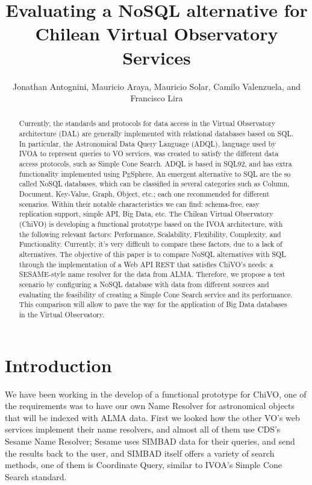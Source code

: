 \documentclass[11pt,twoside]{article}
\begin{document}
\title{Evaluating a NoSQL alternative for Chilean Virtual Observatory Services}
\author{Jonathan Antognini,  Mauricio Araya, Mauricio Solar, Camilo Valenzuela, and  Francisco Lira
}

\begin{abstract}
Currently, the standards and protocols for data access in the Virtual Observatory architecture (DAL) are generally implemented with relational databases based on SQL. In particular, the Astronomical Data Query Language (ADQL), language used by IVOA to represent queries to VO services, was created to satisfy the different data access protocols, such as Simple Cone Search. ADQL is based in SQL92, and has extra functionality implemented using PgSphere. An emergent alternative to SQL are the so called NoSQL databases, which can be classified in several categories such as Column, Document, Key-Value, Graph, Object, etc.; each one recommended for different scenarios. Within their notable characteristics we can find: schema-free, easy replication support, simple API, Big Data, etc. The Chilean Virtual Observatory (ChiVO) is developing a functional prototype based on the IVOA architecture, with the following relevant factors: Performance, Scalability, Flexibility, Complexity, and Functionality. Currently, it's very difficult to compare these factors, due to a lack of alternatives. The objective of this paper is to compare NoSQL alternatives with SQL through the implementation of a Web API REST that satisfies ChiVO's needs: a SESAME-style name resolver for the data from ALMA. Therefore, we propose a test scenario by configuring a NoSQL database with data from different sources and evaluating the feasibility of creating a Simple Cone Search service and its performance. This comparison will allow to pave the way for the application of Big Data databases in the Virtual Observatory.
\end{abstract}

\section{Introduction}
We have been working in the develop of a functional prototype for ChiVO, one of the requirements was to have our own Name Resolver for astronomical objects that will be indexed with ALMA data. First we looked how the other VO’s web services implement their name resolvers, and almost all of them use CDS’s Sesame Name Resolver; Sesame uses SIMBAD  data for their queries, and send the results back to the user, and SIMBAD itself offers a variety of search methods, one of them is Coordinate Query, similar to IVOA’s Simple Cone Search standard.
\end{document}
